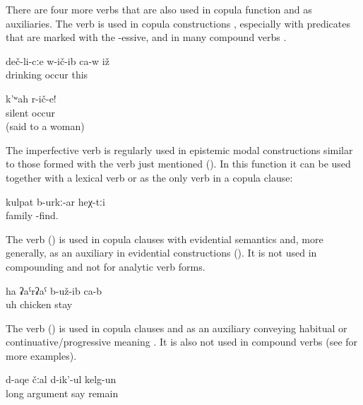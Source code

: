 There are four more verbs that are also used in copula function and as auxiliaries. The verb   is used in copula constructions , especially with predicates that are marked with the -essive, and in many compound verbs .
%
\begin{exe}
	\ex	\label{ex:He became a drinker}
	\gll	deč-li-cːe	w-ič-ib	ca-w	iž\\
		drinking	occur		this\\
	\glt	{}

	\ex	\label{ex:Be silent}
	\gll	k'ʷah	r-ič-e!\\
		silent	occur\\
	\glt	{} (said to a woman)
\end{exe}

The imperfective verb   is regularly used in epistemic modal constructions similar to those formed with the verb   just mentioned (). In this function it can be used together with a lexical verb or as the only verb in a copula clause: 

\begin{exe}
	\ex	\label{They are probably a family.COP}
	\gll	kulpat	b-urkː-ar			heχ-tːi\\
		family	-find.	\\
	\glt	{}
\end{exe}

The verb  ()  is used in copula clauses with evidential semantics  and, more generally, as an auxiliary in evidential constructions (). It is not used in compounding and not for analytic verb forms.
%
\begin{exe}
	\ex	\label{ex:Ah, it turned out to be a chicken}
	\gll	ha	ʡaˁrʡaˁ	b-už-ib	ca-b\\
		uh	chicken	stay	\\
	\glt	{}
\end{exe}

The verb  ()  is used in copula clauses and as an auxiliary conveying habitual or continuative\slash progressive meaning . It is also not used in compound verbs (see  for more examples).
%
\begin{exe}
	\ex	\label{ex:‎‎They were arguing for a long time}
	\gll	d-aqe	čːal	d-ik'-ul	kelg-un\\
		long	argument	say	remain\\
	\glt	{}
\end{exe}
